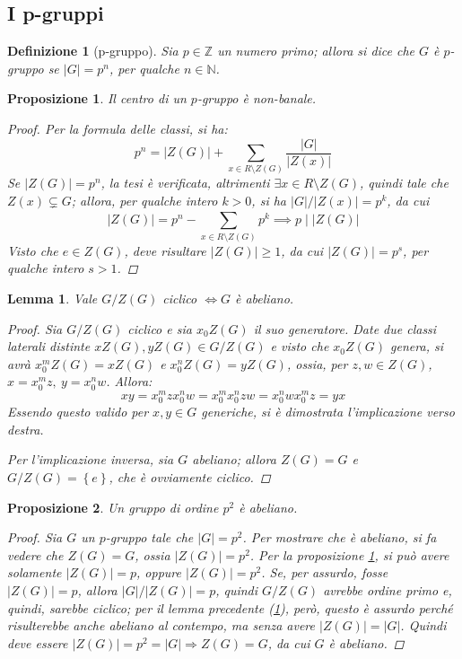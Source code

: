 \documentclass[11pt]{scrartcl}
\theoremstyle{style1}
\newtheorem{prop}{Proposizione}[section]
\newtheorem{lemma}{Lemma}[teorema]
\newtheorem{definizione}{Definizione}[section]
\numberwithin{equation}{subsection}
\begin{document}
\subsection{I p-gruppi}
\begin{definizione}
	[p-gruppo]
	Sia $p \in \mathbb{Z}$ un numero primo; allora si dice che $G$ \`e $p$-gruppo se $\lvert G \rvert = p^n$, per qualche $n \in \mathbb{N}$.
\end{definizione}
\begin{prop}\label{pnb}
	Il centro di un $p$-gruppo \`e non-banale.
	\begin{proof}
		Per la formula delle classi, si ha:
		\[
		p^n = \lvert Z(G) \rvert  + \sum_{x \in R \setminus Z(G)}^{} \frac{\lvert G \rvert }{\lvert Z(x) \rvert }
		\] 
		Se $\lvert Z(G) \rvert  = p^n$, la tesi \`e verificata, altrimenti $\exists x \in R \setminus Z(G)$, quindi tale che $Z(x) \subsetneq G$; allora, per qualche intero $k>0$, si ha $\lvert G \rvert / \lvert Z(x) \rvert = p^k$, da cui
		\[
		\lvert Z(G) \rvert =p^n - \sum_{x \in R \setminus Z(G)}^{} p^k\implies p  \mid \lvert Z(G) \rvert 
		\] 
		Visto che $e \in Z(G)$, deve risultare $\lvert Z(G) \rvert \ge 1$, da cui $\lvert Z(G) \rvert = p^s$, per qualche intero $s > 1$.
	\end{proof}
\end{prop} 
\begin{lemma}\label{GZGciffban}
	Vale $G / Z(G)$ ciclico $\iff G$ \`e abeliano.
	\begin{proof}
		Sia $G / Z(G)$ ciclico e sia $x_0 Z(G)$ il suo generatore.
		Date due classi laterali distinte $xZ(G), yZ(G) \in G / Z(G)$ e visto che $x_0Z(G)$ genera, si avr\`a $x_0^m Z(G)= x Z(G)$ e $x_0^nZ(G) = yZ(G)$, ossia, per $z,w \in Z(G)$, $x = x_0^m z,\ y = x_0^n w$. 
		Allora:
		\[
			 xy = x_0^m z x_0^n w = x_0^m x_0^n zw = x_0^n wx_0^m z = yx
		\] 
	Essendo questo valido per $x,y \in G$ generiche, si \`e dimostrata l'implicazione verso destra.

	Per l'implicazione inversa, sia $G$ abeliano; allora $Z(G) = G$ e $G / Z(G) = \left\{ e \right\} $, che \`e ovviamente ciclico.
	\end{proof}
\end{lemma}
\begin{prop}
	Un gruppo di ordine $p^2$ \`e abeliano.
	\begin{proof}
		Sia $G$ un $p$-gruppo tale che $\lvert G \rvert  = p^2$. Per mostrare che \`e abeliano, si fa vedere che $Z(G) = G$, ossia $\lvert Z(G) \rvert  = p^2$.
		Per la proposizione \ref{pnb}, si pu\`o avere solamente $\lvert Z(G) \rvert = p$, oppure $\lvert Z(G) \rvert = p ^2$.
		Se, per assurdo, fosse $\lvert Z(G) \rvert =p$, allora $\lvert G \rvert / \lvert Z(G) \rvert = p$, quindi $G / Z(G)$ avrebbe ordine primo e, quindi, sarebbe ciclico; per il lemma precedente (\ref{GZGciffban}), per\`o, questo \`e assurdo perch\'e risulterebbe anche abeliano al contempo, ma senza avere $\lvert Z(G) \rvert  = \lvert G \rvert $.
		Quindi deve essere $\lvert Z(G) \rvert  = p^2 = \lvert G \rvert \Rightarrow Z(G) = G$, da cui $G$ \`e abeliano.
	\end{proof}
\end{prop}
\end{document}
